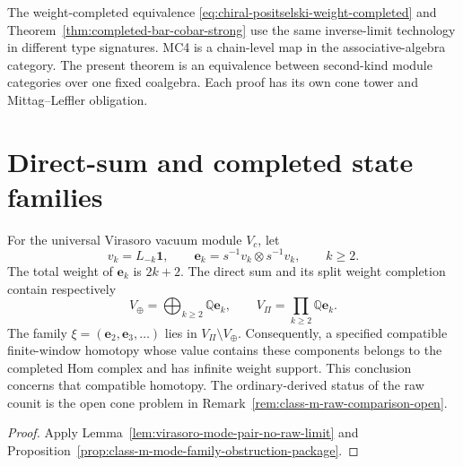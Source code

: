 \begin{remark}
\label{rem:relation-to-MC4-completion}
The weight-completed equivalence
\eqref{eq:chiral-positselski-weight-completed} and
Theorem~\ref{thm:completed-bar-cobar-strong} use the same inverse-limit
technology in different type signatures.  MC4 is a chain-level map in
the associative-algebra category.  The present theorem is an
equivalence between second-kind module categories over one fixed
coalgebra.  Each proof has its own cone tower and Mittag--Leffler
obligation.
\end{remark}

\section{Direct-sum and completed state families}
\label{sec:raw-direct-sum-class-M-false}

\begin{proposition}
\label{prop:chiral-positselski-raw-direct-sum-class-M-false}
For the universal Virasoro vacuum module \(V_c\), let
\[
 v_k=L_{-k}\mathbf1,\qquad
 \mathbf e_k=s^{-1}v_k\otimes s^{-1}v_k,\qquad k\geq2 .
\]
The total weight of \(\mathbf e_k\) is \(2k+2\).  The direct sum and
its split weight completion contain respectively
\[
 V_\oplus=\bigoplus_{k\geq2}\mathbb Q\mathbf e_k,
 \qquad
 V_\Pi=\prod_{k\geq2}\mathbb Q\mathbf e_k .
\]
The family \(\xi=(\mathbf e_2,\mathbf e_3,\ldots)\) lies in
\(V_\Pi\setminus V_\oplus\).  Consequently, a specified compatible
finite-window homotopy whose value contains these components belongs
to the completed Hom complex and has infinite weight support.  This
conclusion concerns that compatible homotopy.  The ordinary-derived
status of the raw counit is the open cone problem in
Remark~\ref{rem:class-m-raw-comparison-open}.
\end{proposition}

\begin{proof}
Apply Lemma~\ref{lem:virasoro-mode-pair-no-raw-limit} and
Proposition~\ref{prop:class-m-mode-family-obstruction-package}.
\end{proof}

